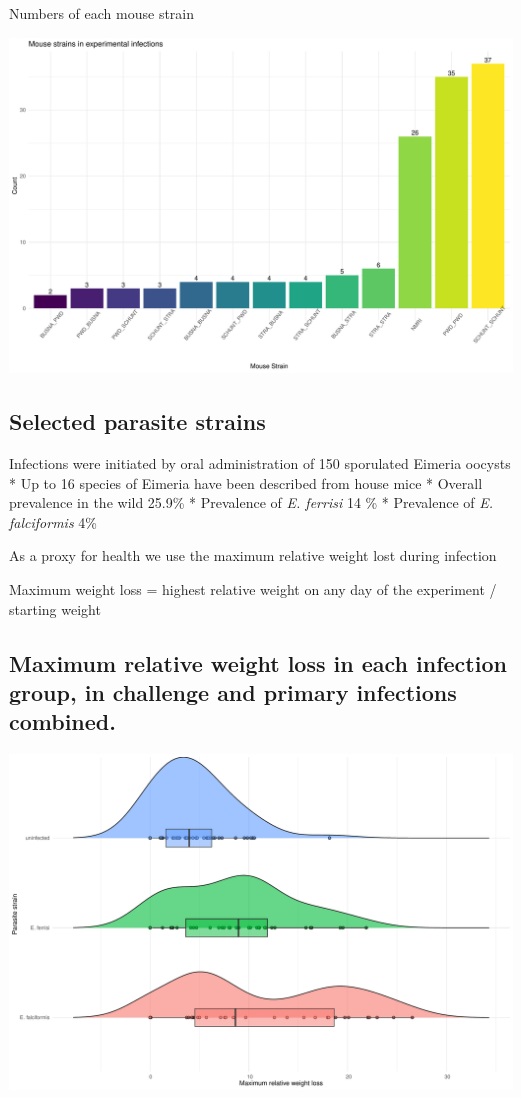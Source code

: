 \documentclass[
]{article}
\begin{document}
Numbers of each mouse strain

\includegraphics{Explorative_Stats_experimental_planning_files/figure-latex/strains-1.pdf}

\subsection{Selected parasite strains}\label{selected-parasite-strains}

Infections were initiated by oral administration of 150 sporulated
Eimeria oocysts * Up to 16 species of Eimeria have been described from
house mice * Overall prevalence in the wild 25.9\% * Prevalence of
\emph{E. ferrisi} 14 \% * Prevalence of \emph{E. falciformis} 4\%

As a proxy for health we use the maximum relative weight lost during
infection

Maximum weight loss = highest relative weight on any day of the
experiment / starting weight

\subsection{Maximum relative weight loss in each infection group, in
challenge and primary infections
combined.}\label{maximum-relative-weight-loss-in-each-infection-group-in-challenge-and-primary-infections-combined.}

\includegraphics{Explorative_Stats_experimental_planning_files/figure-latex/general_WL_parasite-1.pdf}
\end{document}
